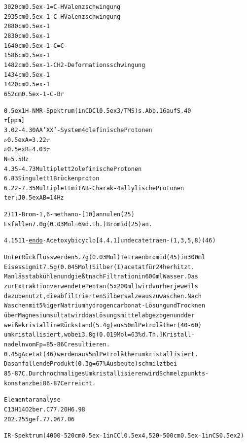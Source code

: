 \documentclass[a4paper,11pt]{article}
\begin{document}
\begin{alltt}

3020 cm\raise0.5ex\hbox{-1} =C-H Valenzschwingung
2935 cm\raise0.5ex\hbox{-1} -C-H Valenzschwingung
2880 cm\raise0.5ex\hbox{-1}
2830 cm\raise0.5ex\hbox{-1}
1640 cm\raise0.5ex\hbox{-1} -C=C-
1586 cm\raise0.5ex\hbox{-1}
1482 cm\raise0.5ex\hbox{-1} -CH2- Deformationsschwingung
1434 cm\raise0.5ex\hbox{-1}
1420 cm\raise0.5ex\hbox{-1}
 652 cm\raise0.5ex\hbox{-1} -C-Br

\leavevmode\raise0.5ex\hbox{1}H-NMR-Spektrum (in CDCl\lower0.5ex\hbox{3}/TMS) s. Abb. 16 auf S. 40
  \(\tau\) [ppm]
3.02 - 4.30 AA'XX'-System              4 olefinische Protonen
            \(\nu\)\lower0.5ex\hbox{A} = 3.22\(\tau\)
            \(\nu\)\lower0.5ex\hbox{B} = 4.03\(\tau\)
            N = 5.5 Hz
4.35 - 4.73 Multiplett                 2 olefinische Protonen
6.83        Singulett                  1 Brückenproton
6.22 - 7.35 Multiplett mit AB-Charak-  4 allylische Protonen
            ter; J\lower0.5ex\hbox{AB} = 14 Hz


2) 11-Brom-1‚6-methano-[10]annulen (25)
   Es fallen 7.0 g (0.03 Mol = 6 \% d.Th.) Bromid (25) an.

\newpage
{}


4.15 11-\underline{endo}-Acetoxybicyclo[4.4.1]undecatetraen-(1‚3,5,8) (46)

Unter Rückfluss werden 5.7 g (0.03 Mol) Tetraenbromid (45) in 300 ml
Eisessig mit 7.5 g (0.045 Mol) Silber(I)acetat für 24 h erhitzt.
Man lässt abkühlen und gießt nach Filtration in 600 ml Wasser. Das
zur Extraktion verwendete Pentan (5 x 200 ml) wird vorher jeweils
dazu benutzt, die abfiltrierten Silbersalze auszuwaschen. Nach
Waschen mit 5 \%iger Natriumhydrogencarbonat-Lösung und Trocknen
über Magnesiumsultat wird das Lösungsmittel abgezogen und der
weiße kristalline Rückstand (5.4 g) aus 50 ml Petroläther (40-60)
umkristallisiert, wobei 3.8 g (0.019 Mol = 63 \% d.Th.] Kristall-
nadeln vom Fp = 85 - 86\degree{}C resultieren.
0.45 g Acetat (46) werden aus 5 ml Petroläther umkristallisiert.
Das anfallende Produkt (0.3 g = 67 \% Ausbeute) schmilzt bei
85 - 87\degree{}C. Durch nochmaliges Umkristallisieren wird Schmelzpunkts-
konstanz bei 86 - 87\degree{}C erreicht.

Elementaranalyse
C13H14O2 ber.   C  77.20  H  6.98
202.255  gef.      77.06     7.06


IR-Spektrum (4000-520 cm\raise0.5ex\hbox{-1} in CCl\lower0.5ex\hbox{4}, 520-500 cm\raise0.5ex\hbox{-1} in CS\lower0.5ex\hbox{2})
\end{alltt}
\end{document}
